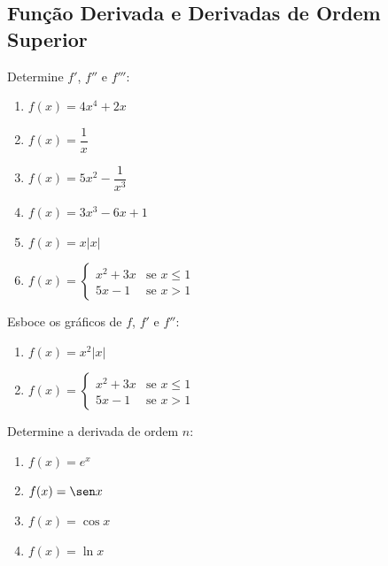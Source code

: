 \subsection{Função Derivada e Derivadas de Ordem Superior}

\begin{exercicio}[1]
Determine $f'$, $f''$ e $f'''$:
\begin{enumerate}[label=\alph*)]
    \item $f(x) = 4x^4 + 2x$
    \item $f(x) = \dfrac{1}{x}$
    \item $f(x) = 5x^2 - \dfrac{1}{x^3}$
    \item $f(x) = 3x^3 - 6x + 1$
    \item $f(x) = x|x|$
    \item $f(x) = \begin{cases} x^2 + 3x & \text{se } x \le 1 \\ 5x - 1 & \text{se } x > 1 \end{cases}$
\end{enumerate}
\end{exercicio}

\begin{exercicio}[2]
Esboce os gráficos de $f$, $f'$ e $f''$:
\begin{enumerate}[label=\alph*)]
    \item $f(x) = x^2 |x|$
    \item $f(x) = \begin{cases} x^2 + 3x & \text{se } x \le 1 \\ 5x - 1 & \text{se } x > 1 \end{cases}$
\end{enumerate}
\end{exercicio}

\begin{exercicio}[3]
Determine a derivada de ordem $n$:
\begin{enumerate}[label=\alph*)]
    \item $f(x) = e^x$
    \item $f(x) = \sen x$
    \item $f(x) = \cos x$
    \item $f(x) = \ln x$
\end{enumerate}
\end{exercicio}

\clearpage

